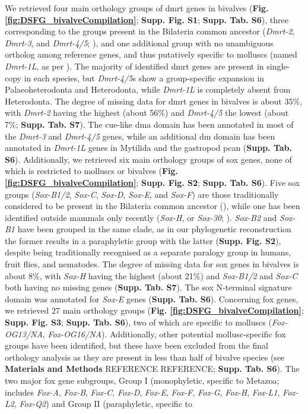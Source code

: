 \documentclass[../main.tex]{subfiles}
\begin{document}
We retrieved four main orthology groups of \gls{dmrt} genes in bivalves (\textbf{Fig. \ref{fig:DSFG_bivalveCompilation}}; \textbf{Supp. Fig. S1}; \textbf{Supp. Tab. S6}), three corresponding to the groups present in the Bilateria common ancestor (\textit{Dmrt-2}, \textit{Dmrt-3}, and \textit{Dmrt-4/5}; \textbf{\cite{mawaribuchi2019independent}}), and one additional group with no unambiguous ortholog among reference genes, and thus putatively specific to molluscs (named \textit{Dmrt-1L}, as per \textbf{\cite{li2018foxl2,evensen2022comparative}}). The majority of identified \gls{dmrt} genes are present in single-copy in each species, but \textit{Dmrt-4/5}s show a group-specific expansion in Palaeoheterodonta and Heterodonta, while \textit{Dmrt-1L} is completely absent from Heterodonta. The degree of missing data for \gls{dmrt} genes in bivalves is about 35\%, with \textit{Dmrt-2} having the highest (about 56\%) and \textit{Dmrt-4/5} the lowest (about 7\%; \textbf{Supp. Tab. S7}). The \gls{cue}-like \gls{dma} domain has been annotated in most of the \textit{Dmrt-3} and \textit{Dmrt-4/5} genes, while an additional \gls{dm} domain has been annotated in \textit{Dmrt-1L} genes in Mytilida and the gastropod \gls{pcan} (\textbf{Supp. Tab. S6}). Additionally, we retrieved six main orthology groups of \gls{sox} genes, none of which is restricted to molluscs or bivalves (\textbf{Fig. \ref{fig:DSFG_bivalveCompilation}}; \textbf{Supp. Fig. S2}; \textbf{Supp. Tab. S6}). Five \gls{sox} groups (\textit{Sox-B1/2}, \textit{Sox-C}, \textit{Sox-D}, \textit{Sox-E}, and \textit{Sox-F}) are those traditionally considered to be present in the Bilateria common ancestor (\textbf{\cite{phochanukul2010no}}), while one has been identified outside mammals only recently (\textit{Sox-H}, or \textit{Sox-30}; \textbf{\cite{han2010characterization}}). \textit{Sox-B2} and \textit{Sox-B1} have been grouped in the same clade, as in our phylogenetic reconstruction the former results in a paraphyletic group with the latter (\textbf{Supp. Fig. S2}), despite being traditionally recognised as a separate paralogy group in humans, fruit flies, and nematodes. The degree of missing data for \gls{sox} genes in bivalves is about 8\%, with \textit{Sox-H} having the highest (about 21\%) and \textit{Sox-B1/2} and \textit{Sox-C} both having no missing genes (\textbf{Supp. Tab. S7}). The \gls{sox} N-terminal signature domain was annotated for \textit{Sox-E} genes (\textbf{Supp. Tab. S6}). Concerning \gls{fox} genes, we retrieved 27 main orthology groups (\textbf{Fig. \ref{fig:DSFG_bivalveCompilation}}; \textbf{Supp. Fig. S3}; \textbf{Supp. Tab. S6}), two of which are specific to molluscs (\textit{Fox-OG13/NA}, \textit{Fox-OG16/NA}). Additionally, other potential mollusc-specific \gls{fox} groups have been identified, but these have been excluded from the final orthology analysis as they are present in less than half of bivalve species (see \textbf{Materials and Methods} REFERENCE REFERENCE; \textbf{Supp. Tab. S6}). The two major \gls{fox} gene subgroups, Group I (monophyletic, specific to Metazoa; includes \textit{Fox-A}, \textit{Fox-B}, \textit{Fox-C}, \textit{Fox-D}, \textit{Fox-E}, \textit{Fox-F}, \textit{Fox-G}, \textit{Fox-H}, \textit{Fox-L1}, \textit{Fox-L2}, \textit{Fox-Q2}) and Group II (paraphyletic, specific to 
\end{document}
